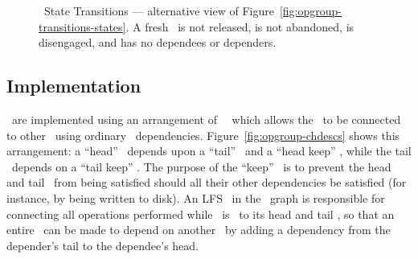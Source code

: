 \begin{figure}[htb]
\caption{\label{fig:opgroup-transitions-intuition} \Opgroup\ State
  Transitions --- alternative view of
  Figure~\ref{fig:opgroup-transitions-states}. A fresh \opgroup\ is
  not released, is not abandoned, is disengaged, and has no dependees
  or dependers.}
\end{figure}


\subsection{Implementation}
\label{sec:opgroup:implementation}


\Opgroups\ are implemented using an arrangement of \noop\ \chdescs\ which allows
the \opgroup\ to be connected to other \opgroups\ using ordinary \chdesc\
dependencies.  Figure~\ref{fig:opgroup-chdescs} shows this arrangement: a
``head'' \chdesc\ depends upon a ``tail'' \chdesc\ and a ``head keep'' \chdesc,
while the tail \chdesc\ depends on a ``tail keep'' \chdesc. The purpose of the
``keep'' \chdescs\ is to prevent the head and tail \chdescs\ from being
satisfied should all their other dependencies be satisfied (for instance, by
being written to disk). An LFS \module\ in the \module\ graph is responsible for
connecting all operations performed while \anopgroup\ is \engaged\ to its head
and tail \chdescs, so that an entire \opgroup\ can be made to depend on another
\opgroup\ by adding a dependency from the depender's tail to the dependee's
head.

